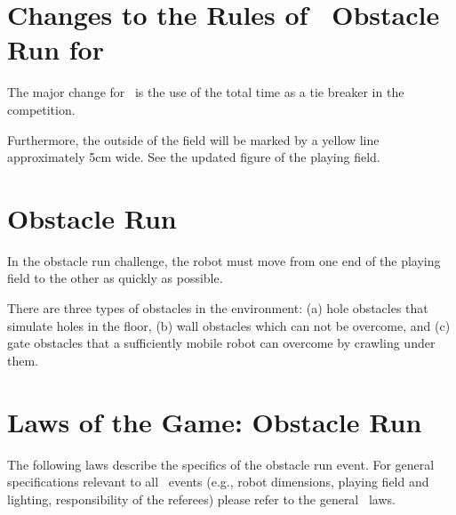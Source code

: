\documentclass[12pt]{hurocup}
\begin{document}
\section*{Changes to the Rules of \HuroCup\ Obstacle Run for \thisyear}

The major change for \thisyear\ is the use of the total time as a tie
breaker in the competition.

Furthermore, the outside of the field will be marked by a yellow line
approximately 5cm wide. See the updated figure of the playing field.

\newpage

\section{Obstacle Run}
\label{subsec:obstacle-run} 

In the obstacle run challenge, the robot must move from one end of the
playing field to the other as quickly as possible.

There are three types of obstacles in the environment: (a) hole
obstacles that simulate holes in the floor, (b) wall obstacles which
can not be overcome, and (c) gate obstacles that a sufficiently mobile
robot can overcome by crawling under them.

\section{Laws of the Game: Obstacle Run}
\label{sec:laws-obstacle-run}

The following laws describe the specifics of the obstacle run
event. For general specifications relevant to all \HuroCup\ events
(e.g., robot dimensions, playing field and lighting, responsibility of
the referees) please refer to the general \HuroCup\ laws.

\label{law:or-field}
\end{document}
